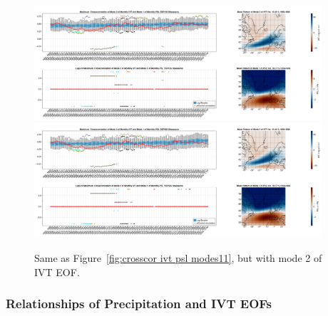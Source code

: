 \begin{figure}
  \begin{center}
    \includegraphics[width=0.95\textwidth]{figures/crosscorrelation_boxplot_ivt_psl_modes21_ssp126_50seasons.png}
    \includegraphics[width=0.95\textwidth]{figures/crosscorrelation_boxplot_ivt_psl_modes21_ssp585_50seasons.png}
  \end{center}
  \caption{Same as Figure~\ref{fig:crosscor ivt psl modes11}, but with mode 2 of IVT EOF.}
  \label{fig:crosscor ivt psl modes21}
\end{figure}






\subsubsection{Relationships of Precipitation and IVT EOFs}

